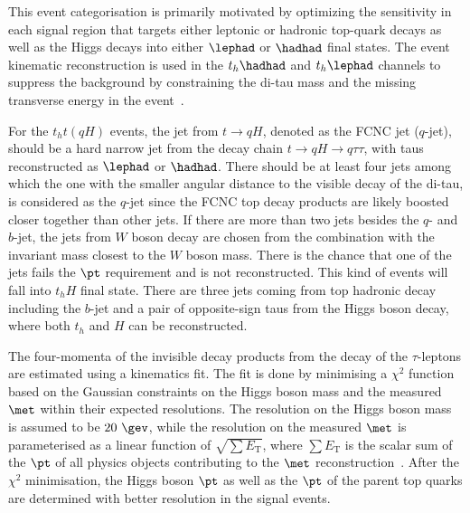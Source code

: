 This event categorisation is primarily motivated by optimizing the sensitivity in each signal region that targets either leptonic or hadronic top-quark
decays as well as the Higgs decays into either $\lephad$ or $\hadhad$ final states.   
The event kinematic reconstruction is used in the $t_h\hadhad$ and $t_h\lephad$ channels to suppress the background by constraining the
di-tau mass and the missing transverse energy in the event~\cite{Chen:2015nta}. 

For the $t_ht(qH)$ events, the jet from $t\to qH$, denoted as the FCNC jet ($q$-jet), should be a hard narrow jet from the
decay chain $t\to qH\to q\tau\tau$, with taus reconstructed as $\lephad$ or $\hadhad$.
There should be at least four jets among which the one with the smaller angular distance to the visible decay of the di-tau,
is considered as the $q$-jet since the FCNC top decay products are likely boosted closer together than other jets. 
If there are more than two jets besides the $q$- and $b$-jet, the jets from $W$ boson decay are chosen from the combination
with the invariant mass closest to the $W$ boson mass. There is the chance that one of the jets fails the $\pt$ requirement and is not reconstructed.
This kind of events will fall into $t_hH$ final state.
There are three jets coming from top hadronic decay including the $b$-jet and a pair of opposite-sign taus from the Higgs boson decay, where
both $t_h$ and $H$ can be reconstructed.  

The four-momenta of the invisible decay products from the decay of the $\tau$-leptons 
are estimated using a kinematics fit. The fit is done by minimising a $\chi^2$ function based on the Gaussian constraints on the Higgs boson mass and the
measured $\met$ within their expected resolutions. The resolution on the Higgs boson mass is assumed to be $20~\gev$, while the resolution on the measured $\met$ is parameterised as a linear function of 
$\sqrt{\sum E_{\text{T}}}$, where $\sum E_{\text{T}}$ is the scalar sum of the $\pt$ of all physics objects contributing to the $\met$ reconstruction~\cite{Aaboud:2018tkc}.
After the $\chi^2$ minimisation, the Higgs boson $\pt$ as well as the 
$\pt$ of the parent top quarks are determined with better resolution in the signal events. 

